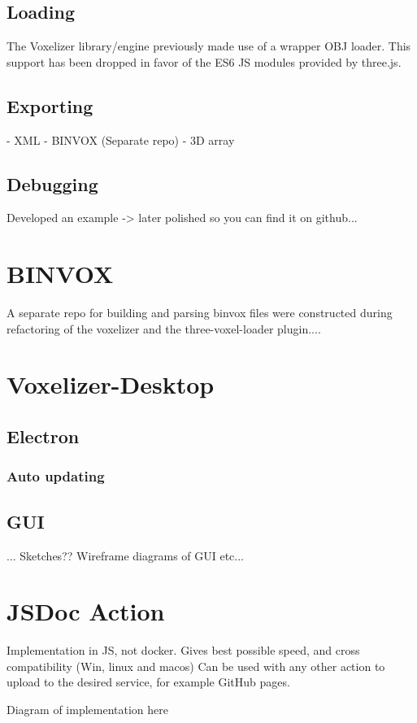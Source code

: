 \subsection{Loading}
The Voxelizer library/engine previously made use of a wrapper OBJ loader.
This support has been dropped in favor of the ES6 JS modules provided by three.js.

\subsection{Exporting}
- XML
- BINVOX (Separate repo)
- 3D array

\subsection{Debugging}
Developed an example -> later polished so you can find it on github...

\section{BINVOX}
A separate repo for building and parsing binvox files were constructed during refactoring of the voxelizer and the three-voxel-loader plugin....

\section{Voxelizer-Desktop}
\subsection{Electron}
\subsubsection{Auto updating}

\subsection{GUI}
... Sketches?? Wireframe diagrams of GUI etc...


\section{JSDoc Action}
Implementation in JS, not docker. Gives best possible speed, and cross compatibility (Win, linux and macos)
Can be used with any other action to upload to the desired service, for example GitHub pages.

\colorbox{RubineRed}{Diagram of implementation here}

